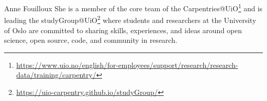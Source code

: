 \begin{participant}[type=R,PM=24,gender=female]{Anne Fouilloux}
  She is a member of the core team of the Carpentries@UiO\footnote{\url{https://www.uio.no/english/for-employees/support/research/research-data/training/carpentry/}} and is leading the studyGroup@UiO\footnote{\url{https://uio-carpentry.github.io/studyGroup/}} where students and researchers at the University of Oslo are committed to sharing skills, experiences, and ideas around open science, open source, code, and community in research.
\end{participant}


